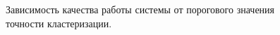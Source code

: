 \documentclass[a4paper, 12pt]{article} %
\begin{document}
	\begin{figure}[h]
	\begin{minipage}[h]{0.49\linewidth}
	\end{minipage}
	\hfill
	\begin{minipage}[h]{0.49\linewidth}
	\end{minipage}
	\caption{Зависимость качества работы системы от порогового значения точности кластеризации.}
	\label{fig:accuraccur}
	\end{figure}
\end{document}
